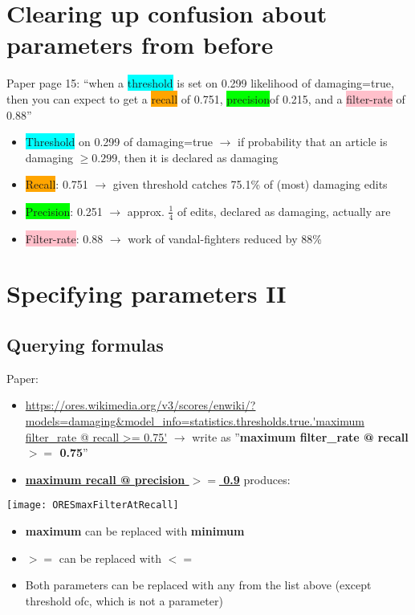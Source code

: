 \documentclass[12pt,a4paper]{article}
\begin{document}
\section{Clearing up confusion about parameters from before}
Paper page 15: ``when a \colorbox{cyan}{threshold} is set on 0.299 likelihood of damaging=true,
then you can expect to get a  \colorbox{orange}{recall} of 0.751,  \colorbox{lime}{precision}of 0.215, and a \colorbox{pink}{filter-rate} of 0.88''
\begin{itemize}
\item \colorbox{cyan}{Threshold} on 0.299 of damaging=true $\rightarrow$ if probability that an article is damaging $\geq 0.299$, then it is declared as damaging
\item  \colorbox{orange}{Recall}: 0.751 $\rightarrow$ given threshold catches 75.1\% of (most) damaging edits
\item  \colorbox{lime}{Precision}: 0.251 $\rightarrow$ approx. $\frac{1}{4}$ of edits, declared as damaging, actually are 
\item \colorbox{pink}{Filter-rate}: 0.88 $\rightarrow$ work of vandal-fighters reduced by 88\%
\end{itemize}
\section{Specifying parameters II}
\subsection{Querying formulas}
Paper:
\begin{itemize}
\item \url{https://ores.wikimedia.org/v3/scores/enwiki/?models=damaging&model_info=statistics.thresholds.true.'maximum filter_rate @ recall >= 0.75'} $\rightarrow$ write as ''\textbf{maximum filter\_rate @ recall $>=$ 0.75}''
\item \href{https://ores.wikimedia.org/v3/scores/enwiki/?models=damaging&model_info=statistics.thresholds.true.%27maximum%20recall%20@%20precision%20%3E=%200.9%27}{\textbf{maximum recall @ precision $>=$ 0.9}} produces:
\end{itemize}
\begin{description}
\item \texttt{[image: ORESmaxFilterAtRecall]}
\end{description}
\begin{itemize}
\item \textbf{maximum} can be replaced with \textbf{minimum}
\item $>=$ can be replaced with $<=$
\item Both parameters can be replaced with any from the list above (except threshold ofc, which is not a parameter)
\end{itemize}
\newpage
\end{document}
